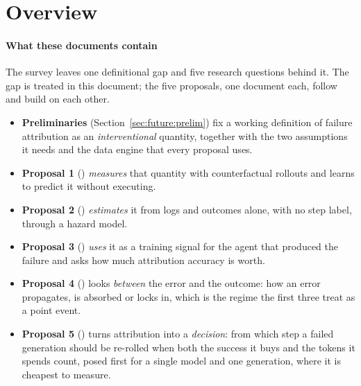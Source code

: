 \documentclass[10pt,a4paper]{article}
\begin{document}

\section{Overview}\label{sec:future}

\paragraph{What these documents contain} The survey leaves one definitional gap and five research questions behind it. The gap is treated in this document; the five proposals, one document each, follow and build on each other.
\begin{itemize}[leftmargin=1.1em]
\item \textbf{Preliminaries} (Section~\ref{sec:future:prelim}) fix a working definition of failure attribution as an \emph{interventional} quantity, together with the two assumptions it needs and the data engine that every proposal uses.
\item \textbf{Proposal 1} () \emph{measures} that quantity with counterfactual rollouts and learns to predict it without executing.
\item \textbf{Proposal 2} () \emph{estimates} it from logs and outcomes alone, with no step label, through a hazard model.
\item \textbf{Proposal 3} () \emph{uses} it as a training signal for the agent that produced the failure and asks how much attribution accuracy is worth.
\item \textbf{Proposal 4} () looks \emph{between} the error and the outcome: how an error propagates, is absorbed or locks in, which is the regime the first three treat as a point event.
\item \textbf{Proposal 5} () turns attribution into a \emph{decision}: from which step a failed generation should be re-rolled when both the success it buys and the tokens it spends count, posed first for a single model and one generation, where it is cheapest to measure.
\end{itemize}
\end{document}
